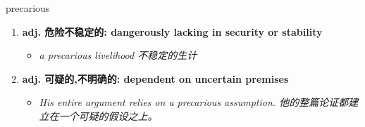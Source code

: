 
\begin{frame}
{\huge precarious}
\begin{center}
\begin{enumerate}\Large
  \item \textbf{adj. 危险不稳定的: dangerously lacking in security or stability}
  \begin{itemize}
    \item \em{\Large{a precarious livelihood 不稳定的生计}}
  \end{itemize}
  \item \textbf{adj. 可疑的,不明确的: dependent on uncertain premises}
  \begin{itemize}
    \item \em{\Large{His entire argument relies on a precarious assumption. 他的整篇论证都建立在一个可疑的假设之上。}}
  \end{itemize}
\end{enumerate}
\end{center}
\end{frame}
